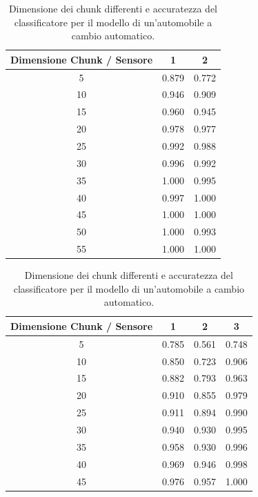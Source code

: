 \documentclass[Lau,binding=0.6cm]{sapthesis}
\begin{document}
\begin{table}[htb]
    \begin{center}
    \begin{tabular}{|c|c|c|}
        \hline
        \textbf{Dimensione Chunk / Sensore} & \textbf{1} & \textbf{2} \\
        \hline
        5 & 0.879 & 0.772 \\
        \hline
        10 & 0.946 & 0.909 \\
        \hline
        15 & 0.960 & 0.945 \\
        \hline
        20 & 0.978 & 0.977 \\
        \hline
        25 & 0.992 & 0.988 \\
        \hline
        30 & 0.996 & 0.992 \\
        \hline
        35 & 1.000 & 0.995 \\
        \hline
        40 & 0.997 & 1.000 \\
        \hline
        45 & 1.000 & 1.000 \\
        \hline
        50 & 1.000 & 0.993 \\
        \hline
        55 & 1.000 & 1.000 \\
        \hline
    \end{tabular}
    \end{center}
    \caption{Dimensione dei chunk differenti e accuratezza del classificatore per il modello di un'automobile a cambio automatico.}
    \label{tab:2}
    \begin{center}
    \begin{tabular}{|c|c|c|c|}
        \hline
        \textbf{Dimensione Chunk / Sensore} & \textbf{1} & \textbf{2} & \textbf{3} \\
        \hline
        5 & 0.785 & 0.561 & 0.748 \\
        \hline
        10 & 0.850 & 0.723 & 0.906 \\
        \hline
        15 & 0.882 & 0.793 & 0.963 \\
        \hline
        20 & 0.910 & 0.855 & 0.979 \\
        \hline
        25 & 0.911 & 0.894 & 0.990 \\
        \hline
        30 & 0.940 & 0.930 & 0.995 \\
        \hline
        35 & 0.958 & 0.930 & 0.996 \\
        \hline
        40 & 0.969 & 0.946 & 0.998 \\
        \hline
        45 & 0.976 & 0.957 & 1.000 \\

\end{tabular}
\end{center}
\end{table}
\end{document}
